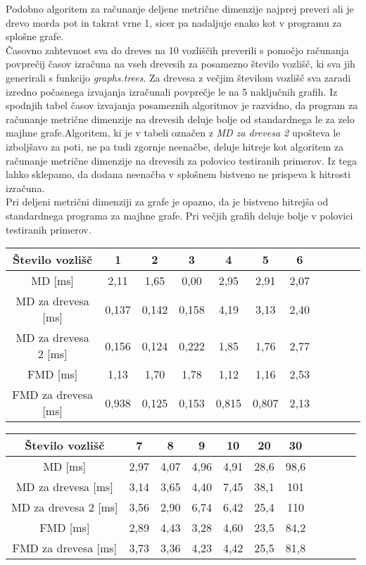 \documentclass[a4paper]{report}
\begin{document}
Podobno algoritem za računanje deljene metrične dimenzije najprej preveri ali je drevo morda pot in takrat vrne 1, sicer pa nadaljuje enako kot v programu za splošne grafe. \\ 

Časovno zahtevnost sva do dreves na 10 vozliščih preverili s pomočjo računanja povprečij časov izračuna na vseh drevesih za posamezno število vozlišč, ki sva jih generirali s funkcijo \textit{graphs.trees}. Za drevesa z večjim številom vozlišč sva zaradi izredno počasnega izvajanja izračunali povprečje le na 5 naključnih grafih. Iz spodnjih tabel časov izvajanja posameznih algoritmov je razvidno, da program za računanje metrične dimenzije na drevesih deluje bolje od standardnega le za zelo majhne grafe.Algoritem, ki je v tabeli označen z \textit{MD za drevesa 2} upošteva le izboljšavo za poti, ne pa tudi zgornje neenačbe, deluje hitreje kot algoritem za računanje metrične dimenzije na drevesih za polovico testiranih primerov. Iz tega lahko sklepamo, da dodana neenačba v splošnem bistveno ne prispeva k hitrosti izračuna. \\

Pri deljeni metrični dimenziji za grafe je opazno, da je bistveno hitrejša od standardnega programa za majhne grafe. Pri večjih grafih deluje bolje v polovici testiranih primerov.

\begin{center}
\resizebox{13cm}{!} {
\begin{tabular}{||c| |*{10}{c|}|}
\hline\hline
Število vozlišč & 1 & 2 & 3 & 4 & 5 & 6 \\
\hline\hline
MD [ms] & 2,11 & 1,65 & 0,00 & 2,95 & 2,91 & 2,07 \\
\hline
MD za drevesa [ms] & 0,137 & 0,142 & 0,158 & 4,19 & 3,13 & 2,40 \\
\hline
MD za drevesa 2 [ms] & 0,156 & 0,124 & 0,222 & 1,85 & 1,76 & 2,77 \\
\hline\hline
FMD [ms] & 1,13 & 1,70 & 1,78 & 1,12 & 1,16 & 2,53 \\
\hline
FMD za drevesa [ms] & 0,938 & 0,125 & 0,153 & 0,815 & 0,807 & 2,13 \\
\hline\hline
\end{tabular}}
\end{center}

\begin{center}
\resizebox{13cm}{!} {
\begin{tabular}{||c| |*{10}{c|}|}
\hline\hline
Število vozlišč & 7 & 8 & 9 & 10 & 20 & 30 \\
\hline\hline
MD [ms] &  2,97 & 4,07 & 4,96 & 4,91 &  28,6 & 98,6 \\
\hline
MD za drevesa [ms] & 3,14 & 3,65 & 4,40 & 7,45 & 38,1 & 101 \\
\hline
MD za drevesa 2 [ms] & 3,56 & 2,90 & 6,74 & 6,42 & 25,4 & 110 \\
\hline\hline
FMD [ms] & 2,89 & 4,43 & 3,28 & 4,60 & 23,5 & 84,2 \\
\hline
FMD za drevesa [ms] & 3,73 & 3,36 & 4,23 & 4,42 & 25,5 & 81,8 \\
\hline\hline
\end{tabular}}
\end{center}
\end{document}
